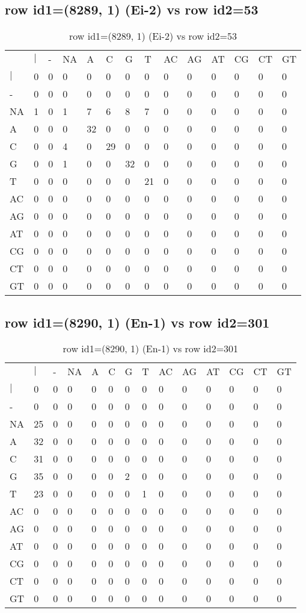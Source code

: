 \subsection{row id1=(8289, 1) (Ei-2) vs row id2=53}
\begin{center}
\begin{longtable}{|l|l|l|l|l|l|l|l|l|l|l|l|l|l|}
\caption{row id1=(8289, 1) (Ei-2) vs row id2=53} \label{table_dm262}\\
\hline
\\
\hline
&$|$&-&NA&A&C&G&T&AC&AG&AT&CG&CT&GT\\
$|$&0&0&0&0&0&0&0&0&0&0&0&0&0\\
-&0&0&0&0&0&0&0&0&0&0&0&0&0\\
NA&1&0&1&7&6&8&7&0&0&0&0&0&0\\
A&0&0&0&32&0&0&0&0&0&0&0&0&0\\
C&0&0&4&0&29&0&0&0&0&0&0&0&0\\
G&0&0&1&0&0&32&0&0&0&0&0&0&0\\
T&0&0&0&0&0&0&21&0&0&0&0&0&0\\
AC&0&0&0&0&0&0&0&0&0&0&0&0&0\\
AG&0&0&0&0&0&0&0&0&0&0&0&0&0\\
AT&0&0&0&0&0&0&0&0&0&0&0&0&0\\
CG&0&0&0&0&0&0&0&0&0&0&0&0&0\\
CT&0&0&0&0&0&0&0&0&0&0&0&0&0\\
GT&0&0&0&0&0&0&0&0&0&0&0&0&0\\
\hline
\end{longtable}
\end{center}

\subsection{row id1=(8290, 1) (En-1) vs row id2=301}
\begin{center}
\begin{longtable}{|l|l|l|l|l|l|l|l|l|l|l|l|l|l|}
\caption{row id1=(8290, 1) (En-1) vs row id2=301} \label{table_dm264}\\
\hline
\\
\hline
&$|$&-&NA&A&C&G&T&AC&AG&AT&CG&CT&GT\\
$|$&0&0&0&0&0&0&0&0&0&0&0&0&0\\
-&0&0&0&0&0&0&0&0&0&0&0&0&0\\
NA&25&0&0&0&0&0&0&0&0&0&0&0&0\\
A&32&0&0&0&0&0&0&0&0&0&0&0&0\\
C&31&0&0&0&0&0&0&0&0&0&0&0&0\\
G&35&0&0&0&0&2&0&0&0&0&0&0&0\\
T&23&0&0&0&0&0&1&0&0&0&0&0&0\\
AC&0&0&0&0&0&0&0&0&0&0&0&0&0\\
AG&0&0&0&0&0&0&0&0&0&0&0&0&0\\
AT&0&0&0&0&0&0&0&0&0&0&0&0&0\\
CG&0&0&0&0&0&0&0&0&0&0&0&0&0\\
CT&0&0&0&0&0&0&0&0&0&0&0&0&0\\
GT&0&0&0&0&0&0&0&0&0&0&0&0&0\\
\hline
\end{longtable}
\end{center}

